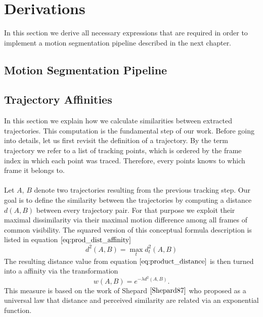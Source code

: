 \chapter{Derivations}
In this section we derive all necessary expressions that are required in order to implement a motion segmentation pipeline described in the next chapter.

\section{Motion Segmentation Pipeline}

\section{Trajectory Affinities}
\label{sec:trajectory_affinities}
In this section we explain how we calculate similarities between extracted trajectories. This computation is the fundamental step of our work.
Before going into details, let us first revisit the definition of a trajectory. By the term trajectory we refer to a list of tracking points, which is ordered by the frame index in which each point was traced. Therefore, every points knows to which frame it belongs to. \\ \\
Let $A$, $B$ denote two trajectories resulting from the previous tracking step. Our goal is to define the similarity between the trajectories by computing a distance $d(A,B)$ between every trajectory pair. For that purpose we exploit their maximal dissimilarity via their maximal motion difference among all frames of common visibility. The squared version of this conceptual formula description is listed in equation $\ref{eq:prod_dist_affinity}$ 
\begin{equation}
	d^2 \left( A, B \right) = \max_t d_t^2 \left( A, B \right)
	\label{eq:product_distance}
\end{equation}
The resulting distance value from equation $\ref{eq:product_distance}$ is then turned into a affinity via the transformation
\begin{equation}
	w \left( A, B \right) = e^{ -\lambda d^2 (A, B) }.
	\label{eq:prod_dist_affinity}
\end{equation}
This measure is based on the work of Shepard $\cite{Shepard87}$ who proposed as a universal law that distance and perceived similarity are related via an exponential function.


